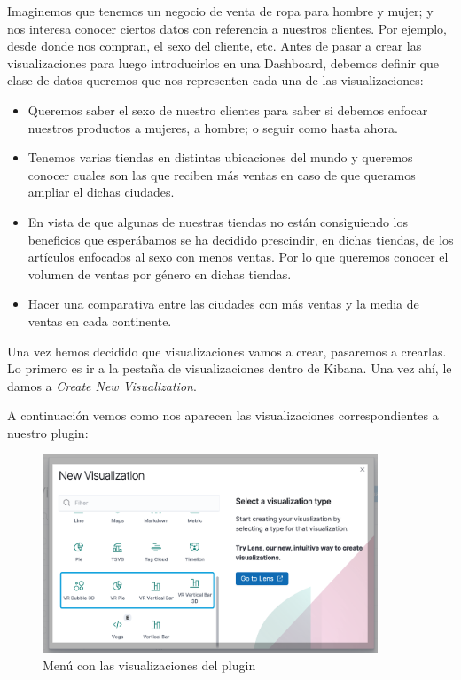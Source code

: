 \documentclass[a4paper, 12pt]{book}
\begin{document}
Imaginemos que tenemos un negocio de venta de ropa para hombre y mujer; y nos interesa conocer ciertos datos con referencia a nuestros clientes. Por ejemplo, desde donde nos compran, el sexo del cliente, etc. Antes de pasar a crear las visualizaciones para luego introducirlos en una Dashboard, debemos definir que clase de datos queremos que nos representen cada una de las visualizaciones:

\begin{itemize}
    \item Queremos saber el sexo de nuestro clientes para saber si debemos enfocar nuestros productos a mujeres, a hombre; o seguir como hasta ahora.
    \item Tenemos varias tiendas en distintas ubicaciones del mundo y queremos conocer cuales son las que reciben más ventas en caso de que queramos ampliar el dichas ciudades.
    \item En vista de que algunas de nuestras tiendas no están consiguiendo los beneficios que esperábamos se ha decidido prescindir, en dichas tiendas, de los artículos enfocados al sexo con menos ventas. Por lo que queremos conocer el volumen de ventas por género en dichas tiendas.
    \item Hacer una comparativa entre las ciudades con más ventas y la media de ventas en cada continente.
\end{itemize}

Una vez hemos decidido que visualizaciones vamos a crear, pasaremos a crearlas. Lo primero es ir a la pestaña de visualizaciones dentro de Kibana. Una vez ahí, le damos a \textit{Create New Visualization}.

A continuación vemos como nos aparecen las visualizaciones correspondientes a nuestro plugin:

\begin{figure}[H]
  \centering
  \includegraphics[width=10cm, keepaspectratio]{img/development/visualizaciones-menu-use.png}
  \caption{Menú con las visualizaciones del plugin}
  \label{fig:menuvisualizacionesuse}
\end{figure}
\end{document}
